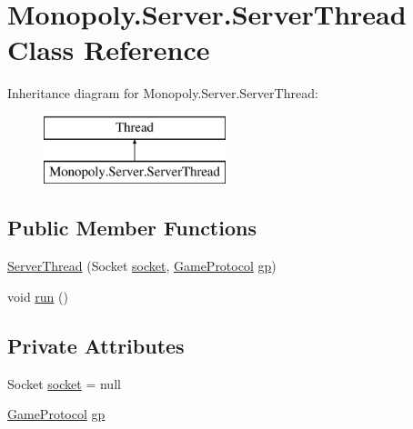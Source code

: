 \hypertarget{class_monopoly_1_1_server_1_1_server_thread}{}\section{Monopoly.\+Server.\+Server\+Thread Class Reference}
\label{class_monopoly_1_1_server_1_1_server_thread}
Inheritance diagram for Monopoly.\+Server.\+Server\+Thread\+:\begin{figure}[H]
\begin{center}
\leavevmode
\includegraphics[height=2.000000cm]{class_monopoly_1_1_server_1_1_server_thread}
\end{center}
\end{figure}
\subsection*{Public Member Functions}
\begin{DoxyCompactItemize}
\item 
\hyperlink{class_monopoly_1_1_server_1_1_server_thread_a3360200fc8f761976fca499682a874ed}{Server\+Thread} (Socket \hyperlink{class_monopoly_1_1_server_1_1_server_thread_a19c9a9d75155a759aa029544141ee09a}{socket}, \hyperlink{class_monopoly_1_1_server_1_1_game_protocol}{Game\+Protocol} \hyperlink{class_monopoly_1_1_server_1_1_server_thread_a1f3548c7768315759bdc1a5d3f6761c4}{gp})
\item 
void \hyperlink{class_monopoly_1_1_server_1_1_server_thread_a30672675943ef522117579416c4ca4fc}{run} ()
\end{DoxyCompactItemize}
\subsection*{Private Attributes}
\begin{DoxyCompactItemize}
\item 
Socket \hyperlink{class_monopoly_1_1_server_1_1_server_thread_a19c9a9d75155a759aa029544141ee09a}{socket} = null
\item 
\hyperlink{class_monopoly_1_1_server_1_1_game_protocol}{Game\+Protocol} \hyperlink{class_monopoly_1_1_server_1_1_server_thread_a1f3548c7768315759bdc1a5d3f6761c4}{gp}
\end{DoxyCompactItemize}


